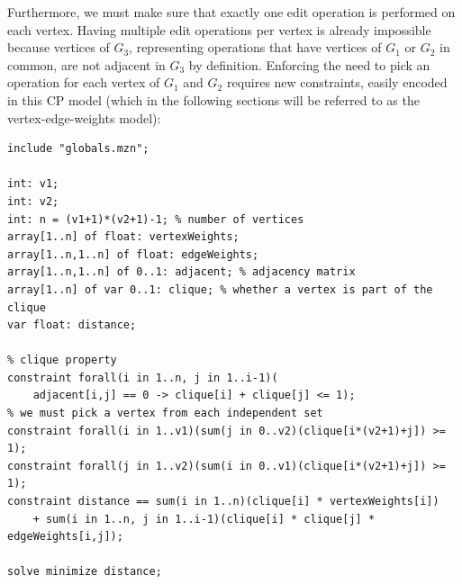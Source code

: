 \documentclass{article}
\theoremstyle{definition}
\begin{document}
Furthermore, we must make sure that exactly one edit operation is performed on each vertex. Having multiple edit operations per vertex is already impossible because vertices of $G_3$, representing operations that have vertices of $G_1$ or $G_2$ in common, are not adjacent in $G_3$ by definition. Enforcing the need to pick an operation for each vertex of $G_1$ and $G_2$ requires new constraints, easily encoded in this CP model (which in the following sections will be referred to as the vertex-edge-weights model):
\begin{lstlisting}
include "globals.mzn";

int: v1;
int: v2;
int: n = (v1+1)*(v2+1)-1; % number of vertices
array[1..n] of float: vertexWeights;
array[1..n,1..n] of float: edgeWeights;
array[1..n,1..n] of 0..1: adjacent; % adjacency matrix
array[1..n] of var 0..1: clique; % whether a vertex is part of the clique
var float: distance;

% clique property
constraint forall(i in 1..n, j in 1..i-1)(
    adjacent[i,j] == 0 -> clique[i] + clique[j] <= 1);
% we must pick a vertex from each independent set
constraint forall(i in 1..v1)(sum(j in 0..v2)(clique[i*(v2+1)+j]) >= 1);
constraint forall(j in 1..v2)(sum(i in 0..v1)(clique[i*(v2+1)+j]) >= 1);
constraint distance == sum(i in 1..n)(clique[i] * vertexWeights[i])
    + sum(i in 1..n, j in 1..i-1)(clique[i] * clique[j] * edgeWeights[i,j]);

solve minimize distance;
\end{lstlisting}
\end{document}
